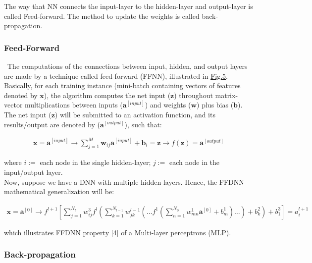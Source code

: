 The way that NN connects the input-layer to the hidden-layer and output-layer is called Feed-forward. The method to update the weights is called back-propagation.

\subsubsection{Feed-Forward}
\label{chap:Feed-Forward}

\quad \, The computations of the connections between input, hidden, and output layers are made by a technique called feed-forward (FFNN), illustrated in \hyperref[fig:fig5]{Fig.5}. Basically, for each training instance (mini-batch containing vectors of features denoted by $\textbf{x}$), the algorithm computes the net input ($\textbf{z}$) throughout matrix-vector multiplications between inputs ($\textbf{a}^{[input]}$) and weights ($\textbf{w}$) plus bias ($\textbf{b}$). The net input ($\textbf{z}$) will be submitted to an activation function, and its results/output are denoted by ($\textbf{a}^{[output]}$), such that:

\begin{align*}
\textbf{x} = \textbf{a}^{[input]} \rightarrow \sum_{j=1}^{M} \textbf{w}_{ij} \textbf{a}^{[input]} + \textbf{b}_i = \textbf{z}
\rightarrow f(\textbf{z}) = \textbf{a}^{[output]}
\end{align*}

\noindent where $i :=$ each node in the single hidden-layer; $j :=$ each node in the input/output layer.\\

Now, suppose we have a DNN with multiple hidden-layers. Hence, the FFDNN mathematical generalization will be:

\begin{align*}
\textbf{x} = \textbf{a}^{[0]} \rightarrow f^{l+1}\left[\!\sum_{j=1}^{N_l} w_{ij}^3 f^l\left(\sum_{k=1}^{N_{l-1}}w_{jk}^{l-1}\left(\dots f^1\left(\sum_{n=1}^{N_0} w_{mn}^1 \textbf{a}^{[0]}+ b_m^1\right)\dots\right)+b_k^2\right)+b_1^3\right] = a^{l+1}_i
\end{align*}

\noindent which illustrates FFDNN property \hyperref[Bib:Week40Notes]{[4]} of a Multi-layer perceptrons (MLP).\\

\subsubsection{Back-propagation}
\label{chap:Back-propagation}

